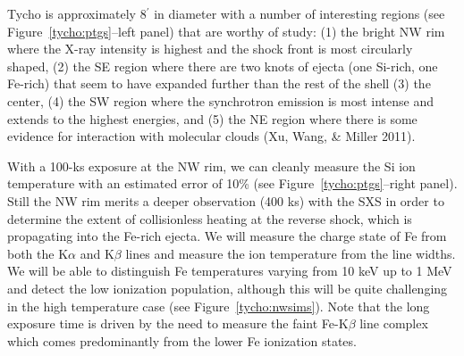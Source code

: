 \documentclass[11pt,a4paper]{article}
\begin{document}
{Tycho is approximately 8$^\prime$ in diameter with a number of
interesting regions (see Figure~\ref{tycho:ptgs}--left panel) that are
worthy of study: (1) the bright NW rim where the X-ray intensity is
highest and the shock front is most circularly shaped, (2) the SE
region where there are two knots of ejecta (one Si-rich, one Fe-rich)
that seem to have expanded further than the rest of the shell (3) the
center, (4) the SW region where the synchrotron emission is most
intense and extends to the highest energies, and (5) the NE region
where there is some evidence for interaction with molecular clouds (Xu, Wang, \& Miller 2011).

With a 100-ks exposure at the NW rim, we can cleanly measure the Si
ion temperature with an estimated error of 10\% (see
Figure~\ref{tycho:ptgs}--right panel). Still the NW rim merits a deeper
observation (400 ks) with the SXS in order to determine the extent of
collisionless heating at the reverse shock, which is propagating into
the Fe-rich ejecta.  We will measure the charge state of Fe from both
the K$\alpha$ and K$\beta$ lines and measure the ion temperature from
the line widths.  We will be able to distinguish Fe temperatures
varying from 10 keV up to 1 MeV and detect the low ionization
population, although this will be quite challenging in the high
temperature case (see Figure~\ref{tycho:nwsims}).  Note that the long
exposure time is driven by the need to measure the faint Fe-K$\beta$
line complex which comes predominantly from the lower Fe ionization
states.  



}
\end{document}
